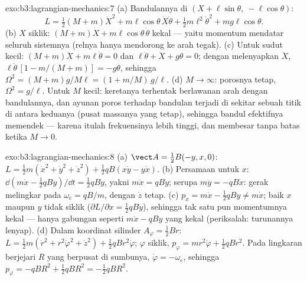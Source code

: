 \begin{solution}{exo:b3:lagrangian-mechanics:7}
(a) Bandulannya di $(X + \ell\sin\theta,\ -\ell\cos\theta)$:
\[
L = \tfrac12(M + m)\dot X^2 + m\ell\cos\theta\,\dot X\dot\theta
 + \tfrac12 m\ell^2\dot\theta^2 + mg\ell\cos\theta .
\]
(b) $X$ siklik: $(M + m)\dot X + m\ell\cos\theta\,\dot\theta$ kekal ---
yaitu momentum mendatar seluruh sistemnya (relnya hanya mendorong ke
arah tegak). (c) Untuk sudut kecil: $(M + m)\ddot X +
m\ell\ddot\theta = 0$ dan $\ell\ddot\theta + \ddot X + g\theta = 0$;
dengan melenyapkan $\ddot X$, $\ell\ddot\theta\,[1 - m/(M + m)] = -g\theta$,
sehingga $\Omega^2 = (M + m)g/M\ell = (1 + m/M)\,g/\ell$. (d) $M \to \infty$:
porosnya tetap, $\Omega^2 = g/\ell$. Untuk $M$ kecil: keretanya
terhentak berlawanan arah dengan bandulannya, dan ayunan poros terhadap
bandulan terjadi di sekitar sebuah titik di antara keduanya (pusat
massanya yang tetap), sehingga bandul efektifnya memendek --- karena
itulah frekuensinya lebih tinggi, dan membesar tanpa batas ketika $M \to 0$.
\end{solution}

\begin{solution}{exo:b3:lagrangian-mechanics:8}
(a) $\vect A = \tfrac12 B(-y, x, 0)$:
$L = \tfrac12 m(\dot x^2 + \dot y^2 + \dot z^2) + \tfrac12 qB(x\dot y -
y\dot x)$. (b) Persamaan untuk $x$: $\dd(m\dot x - \tfrac12 qBy)/\dd t =
\tfrac12 qB\dot y$, yakni $m\ddot x = qB\dot y$; serupa $m\ddot y =
-qB\dot x$: gerak melingkar pada $\omega_{\text{c}} = qB/m$, dengan $\dot z$
tetap. (c) $p_x = m\dot x - \tfrac12 qBy \neq m\dot x$; baik $x$
maupun $y$ tidak siklik ($\partial L/\partial x = \tfrac12 qB\dot y$),
sehingga tak satu pun momentumnya kekal --- hanya gabungan seperti $m\dot x -
qBy$ yang kekal (periksalah: turunannya lenyap). (d) Dalam koordinat
silinder $A_\varphi = \tfrac12 Br$:
$L = \tfrac12 m(\dot r^2 + r^2\dot\varphi^2 + \dot z^2) + \tfrac12
qBr^2\dot\varphi$; $\varphi$ siklik, $p_\varphi = mr^2\dot\varphi +
\tfrac12 qBr^2$. Pada lingkaran berjejari $R$ yang berpusat di sumbunya,
$\dot\varphi = -\omega_{\text{c}}$, sehingga $p_\varphi = -qBR^2 + \tfrac12
qBR^2 = -\tfrac12 qBR^2$.
\end{solution}

